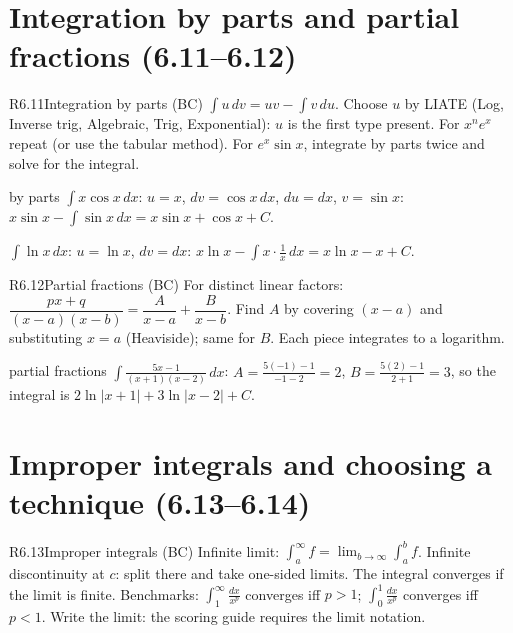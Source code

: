 \documentclass{apcalc}
\begin{document}
\section{Integration by parts and partial fractions (6.11--6.12)}

\begin{rulebox}{R6.11}{Integration by parts (BC)}
$\int u\,dv=uv-\int v\,du$. Choose $u$ by LIATE (Log, Inverse trig, Algebraic, Trig, Exponential): $u$ is the first type present. For $x^ne^{x}$ repeat (or use the tabular method). For $e^x\sin x$, integrate by parts twice and solve for the integral.
\end{rulebox}

\begin{example}{by parts}
$\int x\cos x\,dx$: $u=x$, $dv=\cos x\,dx$, $du=dx$, $v=\sin x$: $x\sin x-\int\sin x\,dx=x\sin x+\cos x+C$.\par
$\int\ln x\,dx$: $u=\ln x$, $dv=dx$: $x\ln x-\int x\cdot\frac1x\,dx=x\ln x-x+C$.
\end{example}

\begin{rulebox}{R6.12}{Partial fractions (BC)}
For distinct linear factors: $\dfrac{px+q}{(x-a)(x-b)}=\dfrac{A}{x-a}+\dfrac{B}{x-b}$. Find $A$ by covering $(x-a)$ and substituting $x=a$ (Heaviside); same for $B$. Each piece integrates to a logarithm.
\end{rulebox}

\begin{example}{partial fractions}
$\displaystyle\int\frac{5x-1}{(x+1)(x-2)}\,dx$: $A=\frac{5(-1)-1}{-1-2}=2$, $B=\frac{5(2)-1}{2+1}=3$, so the integral is $2\ln|x+1|+3\ln|x-2|+C$.
\end{example}

\section{Improper integrals and choosing a technique (6.13--6.14)}

\begin{rulebox}{R6.13}{Improper integrals (BC)}
Infinite limit: $\int_a^\infty f=\lim_{b\to\infty}\int_a^b f$. Infinite discontinuity at $c$: split there and take one-sided limits. The integral converges if the limit is finite. Benchmarks: $\int_1^\infty\frac{dx}{x^p}$ converges iff $p>1$; $\int_0^1\frac{dx}{x^p}$ converges iff $p<1$. Write the limit: the scoring guide requires the limit notation.
\end{rulebox}
\end{document}

